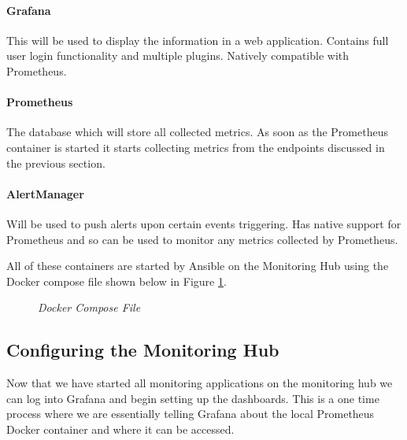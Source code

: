\paragraph{Grafana} This will be used to display the information in a web application. Contains full user login functionality and multiple plugins. Natively compatible with Prometheus.

\paragraph{Prometheus} The database which will store all collected metrics. As soon as the Prometheus container is started it starts collecting metrics from the endpoints discussed in the previous section.

\paragraph{AlertManager} Will be used to push alerts upon certain events triggering. Has native support for Prometheus and so can be used to monitor any metrics collected by Prometheus.

All of these containers are started by Ansible on the Monitoring Hub using the Docker compose file shown below in Figure \ref{fig:combined}.

\begin{figure}[!ht]
\centering
{}
\caption{\em Docker Compose File}
\label{fig:combined}
\end{figure}

\subsection{Configuring the Monitoring Hub}
Now that we have started all monitoring applications on the monitoring hub we can log into Grafana and begin setting up the dashboards. This is a one time process where we are essentially telling Grafana about the local Prometheus Docker container and where it can be accessed.

